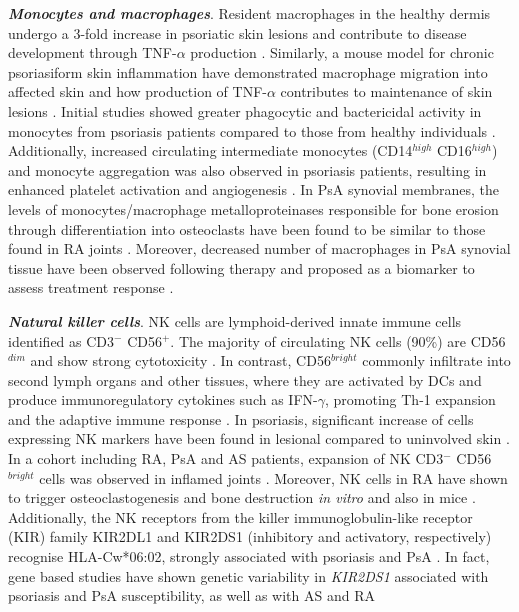\textbf{\textit{Monocytes and macrophages}}. Resident macrophages in the healthy dermis undergo a 3-fold increase in psoriatic skin lesions and contribute to disease development through TNF-$\alpha$ production \parencite{Perera2012, Mahil2016}. Similarly, a mouse model for chronic psoriasiform skin inflammation have demonstrated macrophage migration into affected skin and how production of TNF-$\alpha$ contributes to maintenance of skin lesions \parencite{Stratis2006, Wang2006}. Initial studies showed greater phagocytic and bactericidal activity in monocytes from psoriasis patients compared to those from healthy individuals \parencite{Bar-Eli1979}. Additionally, increased circulating intermediate monocytes (CD14$^{high}$ CD16$^{high}$) and monocyte aggregation was also observed in psoriasis patients, resulting in enhanced platelet activation and angiogenesis \parencite{Golden2015}. In PsA synovial membranes, the levels of monocytes/macrophage metalloproteinases responsible for bone erosion through differentiation into osteoclasts have been found to be similar to those found in RA joints \parencite{Hitchon2002}. Moreover, decreased number of macrophages in PsA synovial tissue have been observed following therapy and proposed as a biomarker to assess treatment response \parencite{Canete2010}.

\textbf{\textit{Natural killer cells}}. NK cells are lymphoid-derived innate immune cells identified as CD3$^-$ CD56$^+$. The majority of circulating NK cells (90\%) are CD56$^{dim}$ and show strong cytotoxicity \parencite{Mandal2015}. In contrast, CD56$^{bright}$  commonly infiltrate into second lymph organs and other tissues, where they are activated by DCs and produce immunoregulatory cytokines such as IFN-$\gamma$, promoting Th-1 expansion and the adaptive immune response \parencite{Martin-Fontecha2004,Ferlazzo2004}. In psoriasis, significant increase of cells expressing NK markers have been found in lesional compared to uninvolved skin \parencite{Cameron2003,Ottaviani2006}.  %
 In a cohort including RA, PsA and AS patients, expansion of NK CD3$^-$ CD56$^{bright}$ cells was observed in inflamed joints \parencite{Dalbeth2002}. Moreover, NK cells in RA have shown to trigger osteoclastogenesis and bone destruction \textit{in vitro} and also in mice \parencite{Soederstroem2010}. %
Additionally, the NK receptors from the killer immunoglobulin-like receptor (KIR) family KIR2DL1 and KIR2DS1 (inhibitory and activatory, respectively) recognise HLA-Cw*06:02, strongly associated with psoriasis and PsA \parencite{Tobin2011}. In fact, gene based studies have shown genetic variability in \textit{KIR2DS1} associated with psoriasis and PsA susceptibility, as well as with AS and RA \parencite{Luszczek2004, Williams2005,Carter2007,Yen2001}


